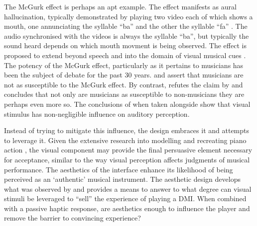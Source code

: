 The McGurk effect is perhaps an apt example. The effect manifests as aural hallucination, typically demonstrated by playing two video each of which shows a mouth, one annunciating the syllable ``ba'' and the other the syllable ``fa'' \cite{horizon_seeing_2010}. The audio synchronised with the videos is always the syllable ``ba'', but typically the sound heard depends on which mouth movment is being observed. The effect is proposed to extend beyond speech and into the domain of visual musical cues \cite{saidana_mcgurk_1990}. The potency of the McGurk effect, particularly as it pertains to musicians has been the subject of debate for the past 30 years. \textcite{proverbio_skilled_2016} and \textcite{alsius_forty_2018} assert that musicians are not as susceptible to the McGurk effect. By contrast, \textcite{politzer_mcgurk_2019} refutes the claim by \textcite{proverbio_skilled_2016} and concludes that not only are musicians as susceptible to non-musicians they are perhaps even more so. The conclusions of \textcite{politzer_mcgurk_2019} when taken alongside \textcite{tsay_sight_2013, fritz_player_2012, fritz_soloist_2014, fritz_listener_2017} show that visual stimulus has non-negligible influence on auditory perception.

Instead of trying to mitigate this influence, the design embraces it and attempts to leverage it. 
Given the extensive research into modelling and recreating piano
action \cite{cadoz_modular_1990, gillespie_haptic_1996, lozada_modelisations_2007,
timmermans_multibody-based_2020}, the visual component may provide the final
persuasive element necessary for acceptance, similar to the way visual
perception affects judgments of musical performance.
The aesthetics of the interface enhance its likelihood of being perceived as an `authentic' musical
instrument. The aesthetic design develops what was observed by \textcite{mcalpine_sampling_2014} and provides a means to answer to what degree can visual stimuli be leveraged to ``sell'' the experience of playing a DMI. When combined with a passive haptic response, are aesthetics enough to influence the player and remove the barrier to convincing experience?



